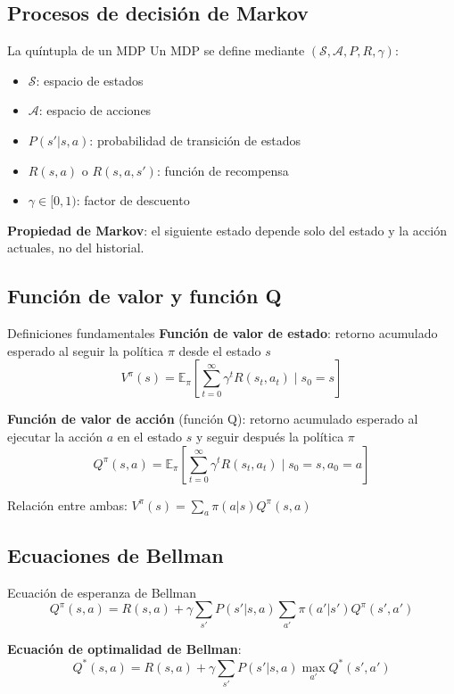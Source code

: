 \documentclass[a4paper]{article}
\begin{document}
\subsection{Procesos de decisión de Markov}

\begin{importantbox}{La quíntupla de un MDP}
Un MDP se define mediante $(\mathcal{S}, \mathcal{A}, P, R, \gamma)$:
\begin{itemize}
    \item $\mathcal{S}$: espacio de estados
    \item $\mathcal{A}$: espacio de acciones
    \item $P(s' | s, a)$: probabilidad de transición de estados
    \item $R(s, a)$ o $R(s, a, s')$: función de recompensa
    \item $\gamma \in [0, 1)$: factor de descuento
\end{itemize}
\textbf{Propiedad de Markov}: el siguiente estado depende solo del estado y la acción actuales, no del historial.
\end{importantbox}

\subsection{Función de valor y función Q}

\begin{importantbox}{Definiciones fundamentales}
\textbf{Función de valor de estado}: retorno acumulado esperado al seguir la política $\pi$ desde el estado $s$
$$V^\pi(s) = \mathbb{E}_\pi\left[\sum_{t=0}^{\infty} \gamma^t R(s_t, a_t) \mid s_0 = s\right]$$

\textbf{Función de valor de acción} (función Q): retorno acumulado esperado al ejecutar la acción $a$ en el estado $s$ y seguir después la política $\pi$
$$Q^\pi(s, a) = \mathbb{E}_\pi\left[\sum_{t=0}^{\infty} \gamma^t R(s_t, a_t) \mid s_0 = s, a_0 = a\right]$$

Relación entre ambas: $V^\pi(s) = \sum_a \pi(a|s) Q^\pi(s, a)$
\end{importantbox}

\subsection{Ecuaciones de Bellman}

\begin{importantbox}{Ecuación de esperanza de Bellman}
$$Q^\pi(s, a) = R(s, a) + \gamma \sum_{s'} P(s'|s,a) \sum_{a'} \pi(a'|s') Q^\pi(s', a')$$

\textbf{Ecuación de optimalidad de Bellman}:
$$Q^*(s, a) = R(s, a) + \gamma \sum_{s'} P(s'|s,a) \max_{a'} Q^*(s', a')$$
\end{importantbox}
\end{document}
